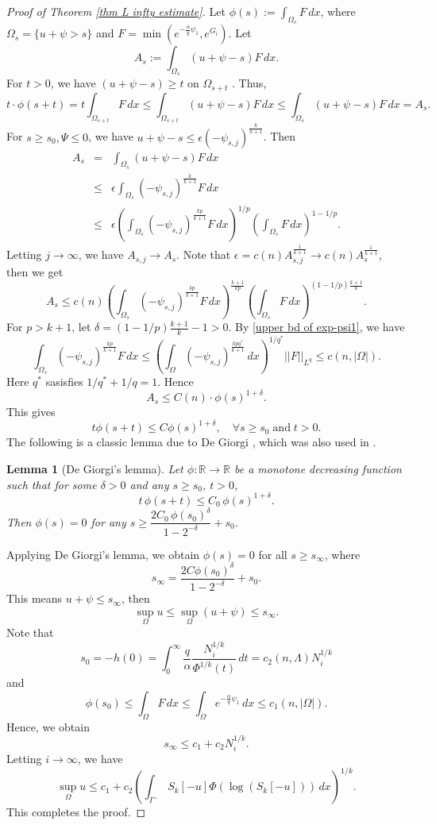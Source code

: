 \documentclass[11pt]{amsart}
\numberwithin{equation}{section}
\newtheorem{lemma}[theorem]{Lemma}
\numberwithin{equation}{section}
\begin{document}
\begin{proof}[Proof of Theorem \ref{thm L infty estimate}]
Let $\phi(s) := \int_{\Omega_s} F \,dx$, where $\Omega_s = \{u + \psi > s\}$ and $F = \min(e^{-\frac{\alpha}{q}\psi_1}, e^{G_i})$.
Let 
\[A_s := \int_{\Omega_s} (u + \psi - s) F \,dx.\]
For $t > 0$, we have $(u+\psi-s) \ge t$ on $\Omega_{s+t}$ . Thus,
\[
t \cdot \phi(s+t) = t \int_{\Omega_{s+t}} F \,dx \le \int_{\Omega_{s+t}} (u+\psi-s) F \,dx \le \int_{\Omega_s} (u+\psi-s) F \,dx = A_s.
\]
For $s\ge s_0, \Psi \le 0$, we have $u+\psi-s \le \epsilon(-\psi_{s,j})^{\frac{k}{k+1}}$. Then 
\begin{eqnarray*}
A_s &=& \int_{\Omega_s} (u+\psi-s) F \,dx \\
&\le& \epsilon \int_{\Omega_s} (-\psi_{s,j})^{\frac{k}{k+1}} F \,dx\\
&\le& \epsilon \left( \int_{\Omega_s} (-\psi_{s,j})^{\frac{kp}{k+1}} F \,dx \right)^{1/p} \left( \int_{\Omega_s} F \,dx \right)^{1-1/p}.
\end{eqnarray*}
Letting $j\to \infty$, we have $A_{s,j}\to A_s$. Note that $\epsilon=c(n)A_{s,j}^{\frac{1}{k+1}}\to c(n)A_{s}^{\frac{1}{k+1}}$, then we get
\[
A_s 
\le c(n) \left( \int_{\Omega_s} (-\psi_{s,j})^{\frac{kp}{k+1}} F \,dx \right)^{\frac{k+1}{kp}} \left( \int_{\Omega_s} F \,dx \right)^{(1-1/p)\frac{k+1}{k}}.
\]
For $p>k+1$, let $\delta=(1-1/p)\frac{k+1}{k}-1>0$.
By \eqref{upper bd of exp-psi1}, we have
\[\int_{\Omega_s} (-\psi_{s,j})^{\frac{kp}{k+1}} F \,dx\leq \left(\int_{\Omega}(-\psi_{s,j})^{\frac{kpq^{*}}{k+1}}\,dx\right)^{1/q^{*}}||F||_{L^q}\le c(n, |\Omega|).\]
Here $q^*$ sasisfies $1/q^{*}+1/q=1$.
Hence
\[A_s \le C(n) \cdot \phi(s)^{1+\delta}.\]
This gives 
\[t \phi(s+t) \le C \phi(s)^{1+\delta}, \quad \forall s\ge s_0\; \text{and} \; t>0.\]
The following is a classic lemma due to De Giorgi \cite{De57}, which was also used in \cites{Ko98, EGZ, GFT}.
\begin{lemma}[De Giorgi's lemma]
	Let $\phi : \mathbb{R} \to \mathbb{R}$ be a monotone decreasing function such that for some $\delta > 0$ and any $s \ge s_0$, $t > 0$,
	\[
	t\,\phi(s+t) \le C_0\,\phi(s)^{1+\delta}.
	\]
	Then $\phi(s) = 0$ for any $s \ge \dfrac{2C_0\,\phi(s_0)^{\delta}}{1 - 2^{-\delta}} + s_0$.
\end{lemma}
Applying De Giorgi's lemma, we obtain $\phi(s) = 0$ for all $s \ge s_\infty$, where
\[
s_\infty = \frac{2 C \phi(s_0)^\delta}{1-2^{-\delta}} + s_0.
\]
This means $u+\psi \le s_\infty$, then
\[\sup_{\Omega} u \le \sup_{\Omega} (u+\psi) \le s_\infty.\]
Note that
\[s_0 = -h(0) = \int_0^\infty \frac{q}{\alpha} \frac{N_i^{1/k}}{\Phi^{1/k}(t)} \,dt = c_2(n,\Lambda) N_i^{1/k}\]
and
\[\phi(s_0) \le \int_{\Omega} F \,dx \le \int_{\Omega} e^{-\frac{\alpha}{q}\psi_1} \,dx \le c_1(n, |\Omega|).\]
Hence, we obtain 
\[s_\infty \le c_1 + c_2 N_i^{1/k}.\]
Letting $i \to \infty$, we have
\[
\sup_{\Omega} u \le c_1+ c_2 \left( \int_{\Gamma^-} S_k[-u] \Phi(\log(S_k[-u])) \,dx \right)^{1/k}.
\]
This completes the proof.
\end{proof}
\end{document}
